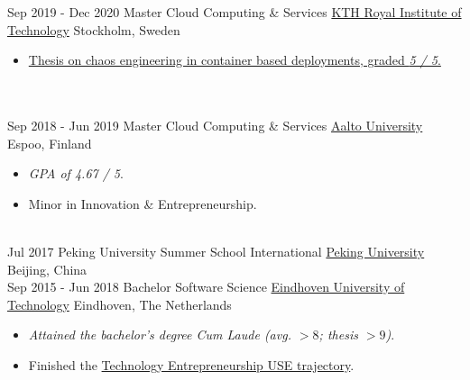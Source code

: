 \documentclass[a4paper]{twentysecondcv} %
\begin{document}
\begin{twenty} %
    \twentyitem
    	{Sep 2019 - }
        {Dec 2020}
        {Master Cloud Computing \& Services}
        {\href{https://kth.se/en}{KTH Royal Institute of Technology}}
        {Stockholm, Sweden}
        {
        \begin{itemize}
            \item \href{https://urn.kb.se/resolve?urn=urn:nbn:se:kth:diva-291281}{Thesis on chaos engineering in container based deployments, graded \emph{5 / 5}.}
        \end{itemize}
        }
    \\
    \\
	\twentyitem
    	{Sep 2018 - }
        {Jun 2019}
        {Master Cloud Computing \& Services}
        {\href{https://www.aalto.fi/en}{Aalto University}}
        {Espoo, Finland}
        {
        \begin{itemize}
            \item \emph{GPA of 4.67 / 5}.
            \item Minor in Innovation \& Entrepreneurship.
        \end{itemize}
        }
    \\
	\twentyitem
    	{Jul 2017}
		{}
        {Peking University Summer School International}
        {\href{http://www.oir.pku.edu.cn/summerschool/}{Peking University}}
        {Beijing, China}
        {
    	}
    \\
    \twentyitem
    	{Sep 2015 - }
        {Jun 2018}
        {Bachelor Software Science}
        {\href{https://tue.nl/}{Eindhoven University of Technology}}
        {Eindhoven, The Netherlands}
        {
       	\begin{itemize}
   			\item \emph{Attained the bachelor's degree Cum Laude (avg. $> 8$; thesis $> 9$)}.
            \item Finished the \href{https://educationguide.tue.nl/programs/bachelor-college/use-learning-trajectory/technology-entrepreneurship/}{Technology Entrepreneurship USE trajectory}.
		\end{itemize}
    	}
\end{twenty}
\end{document}
